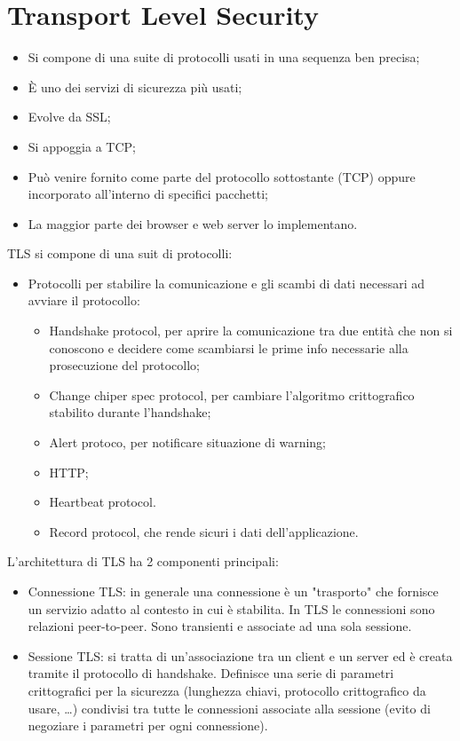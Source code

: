 \section{Transport Level Security}
\begin{itemize}
    \item Si compone di una suite di protocolli usati in una sequenza ben precisa;
	\item È uno dei servizi di sicurezza più usati;
	\item Evolve da SSL;
	\item Si appoggia a TCP;
	\item Può venire fornito come parte del protocollo sottostante (TCP) oppure incorporato all'interno di specifici pacchetti;
	\item La maggior parte dei browser e web server lo implementano.
\end{itemize}

TLS si compone di una suit di protocolli:
\begin{itemize}
    \item Protocolli per stabilire la comunicazione e gli scambi di dati necessari ad avviare il protocollo:
	\begin{itemize}
	    \item Handshake protocol, per aprire la comunicazione tra due entità che non si conoscono  e decidere come scambiarsi le prime info necessarie alla prosecuzione del protocollo;
		\item Change chiper spec protocol, per cambiare l'algoritmo crittografico stabilito durante l'handshake;
		\item Alert protoco, per notificare situazione di warning;
		\item HTTP;
		\item Heartbeat protocol.
	\item Record protocol, che rende sicuri i dati dell'applicazione.
	\end{itemize}
\end{itemize}

L'architettura di TLS ha 2 componenti principali:
\begin{itemize}
    \item Connessione TLS: in generale una connessione è un "trasporto" che fornisce un servizio adatto al contesto in cui è stabilita. In TLS le connessioni sono relazioni peer-to-peer. Sono transienti e associate ad una sola sessione.
	\item Sessione TLS: si tratta di un'associazione tra un client e un server ed è creata tramite il protocollo di handshake. Definisce una serie di parametri crittografici per la sicurezza (lunghezza chiavi, protocollo crittografico da usare, …) condivisi tra tutte le connessioni associate alla sessione (evito di negoziare i parametri per ogni connessione).
\end{itemize}

